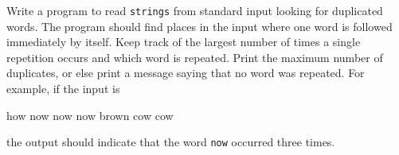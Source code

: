 %
%
\begin{question}
Write a program to read \verb|strings| from standard input
looking for duplicated words. The program should find places in the input
where one word is followed immediately by itself. Keep track of the largest
number of times a single repetition occurs and which word is repeated. Print
the maximum number of duplicates, or else print a message saying that no
word was repeated. For example, if the input is
\begin{codeout}
how now now now brown cow cow
\end{codeout}
the output should indicate that the word \verb|now| occurred three times.
\end{question}
